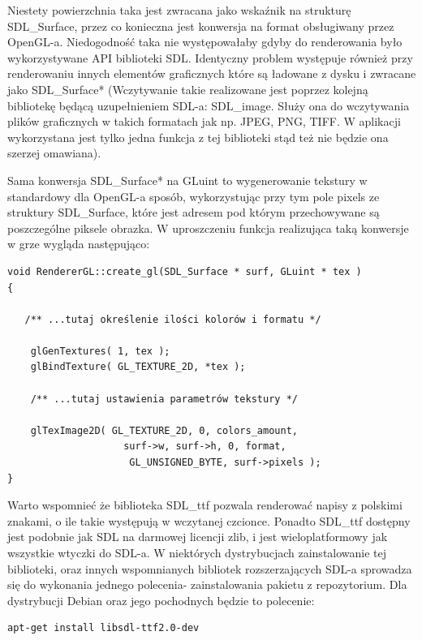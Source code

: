 Niestety powierzchnia taka jest zwracana jako wskaźnik na strukturę SDL\_Surface, przez co konieczna jest konwersja na format obsługiwany przez OpenGL-a. Niedogodność taka nie występowałaby gdyby do renderowania było wykorzystywane API biblioteki SDL. Identyczny problem występuje również przy renderowaniu innych elementów graficznych które są ładowane z dysku i zwracane jako SDL\_Surface* (Wczytywanie takie realizowane jest poprzez kolejną bibliotekę będącą uzupełnieniem SDL-a: SDL\_image. Służy ona do wczytywania plików graficznych w takich formatach jak np. JPEG, PNG, TIFF. W aplikacji wykorzystana jest tylko jedna funkcja 
z tej biblioteki stąd też nie będzie ona szerzej omawiana).

Sama konwersja SDL\_Surface* na GLuint to wygenerowanie tekstury w standardowy dla OpenGL-a sposób, wykorzystując przy tym pole pixels ze struktury SDL\_Surface, które jest adresem pod którym przechowywane są poszczególne piksele obrazka. W uproszczeniu funkcja realizująca taką konwersje w grze wygląda następująco:

\begingroup
\fontsize{10pt}{12pt}\selectfont
\begin{verbatim}  
void RendererGL::create_gl(SDL_Surface * surf, GLuint * tex )
{
 
   /** ...tutaj określenie ilości kolorów i formatu */
  
    glGenTextures( 1, tex );
    glBindTexture( GL_TEXTURE_2D, *tex );

    /** ...tutaj ustawienia parametrów tekstury */

    glTexImage2D( GL_TEXTURE_2D, 0, colors_amount,
    			  	surf->w, surf->h, 0, format, 
    			 	 GL_UNSIGNED_BYTE, surf->pixels );
}
\end{verbatim}
\endgroup

Warto wspomnieć że biblioteka SDL\_ttf pozwala renderować napisy z polskimi znakami, o ile takie występują w wczytanej czcionce. Ponadto SDL\_ttf dostępny jest podobnie jak SDL na darmowej licencji zlib, i jest wieloplatformowy jak wszystkie wtyczki do SDL-a. W niektórych dystrybucjach zainstalowanie tej biblioteki, oraz innych wspomnianych bibliotek rozszerzających SDL-a sprowadza się do wykonania jednego polecenia- zainstalowania pakietu z repozytorium. Dla dystrybucji Debian oraz jego pochodnych będzie to polecenie:
\begin{verbatim}
apt-get install libsdl-ttf2.0-dev 
\end{verbatim}
